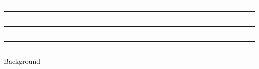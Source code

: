 
\usebox{\topbox}

\vspace{6pt}
\hrule height1pt

\begin{minipage}[t]{21pc}
  \begin{center}
  \vfill %
    \usebox{\vfbox}
  \vspace{6pt} \hrule height1pt \vspace{6pt}
    \usebox{\equipmentbox}
  \vspace{6pt} \hrule height1pt \vspace{6pt}
    \usebox{\grogpbox}
  \end{center}
  \hfill
\end{minipage}
  \vrule width 1pt
\begin{minipage}[t]{24pc}
  \usebox{\sstatbox}
  \vspace{6pt}
  \hrule height1pt
  \vspace*{6pt}%
  \begin{center}
    \usebox{\abilitybox}
  \ifgrogreputations
    \vspace{6pt} \hrule height1pt \vspace{6pt}
    \usebox{\reputationbox}
  \fi
  \end{center}
  \vspace*{6pt}
\end{minipage}
\hrule height1pt
\vspace{6pt}

\usebox{\combatbox}

\vspace{6pt}
\hrule height1pt

\ifdefined\bgbox
\clearpage
\begin{center}
   \Huge\printfamily Background
   \par\vspace{6pt}
   \usebox{\bgbox}
\end{center}
\fi
